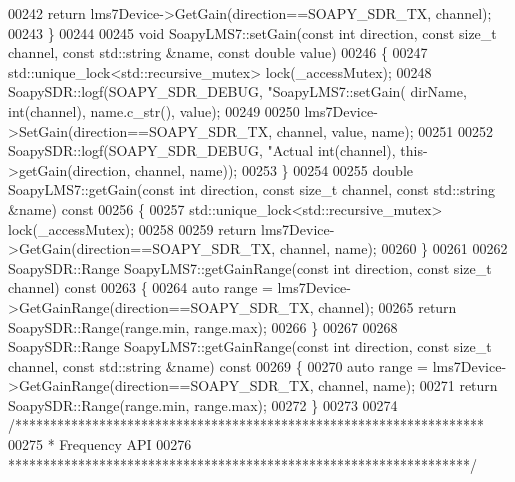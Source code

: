 \begin{DoxyCode}
{{{{{{{{00242     \textcolor{keywordflow}{return} lms7Device->GetGain(direction==SOAPY_SDR_TX, channel);
00243 \}
00244 
00245 \textcolor{keywordtype}{void} SoapyLMS7::setGain(\textcolor{keyword}{const} \textcolor{keywordtype}{int} direction, \textcolor{keyword}{const} \textcolor{keywordtype}{size\_t} channel, \textcolor{keyword}{const} 
      std::string &name, \textcolor{keyword}{const} \textcolor{keywordtype}{double} value)
00246 \{
00247     std::unique\_lock<std::recursive\_mutex> lock(_accessMutex);
00248     SoapySDR::logf(SOAPY_SDR_DEBUG, \textcolor{stringliteral}{"SoapyLMS7::setGain(%
      dirName, \textcolor{keywordtype}{int}(channel), name.c\_str(), value);
00249 
00250     lms7Device->SetGain(direction==SOAPY_SDR_TX, channel, value, name);
00251 
00252     SoapySDR::logf(SOAPY_SDR_DEBUG, \textcolor{stringliteral}{"Actual %
      int(channel), this->getGain(direction, channel, name));
00253 \}
00254 
00255 \textcolor{keywordtype}{double} SoapyLMS7::getGain(\textcolor{keyword}{const} \textcolor{keywordtype}{int} direction, \textcolor{keyword}{const} \textcolor{keywordtype}{size\_t} channel, \textcolor{keyword}{const} 
      std::string &name)\textcolor{keyword}{ const}
00256 \textcolor{keyword}{}\{
00257     std::unique\_lock<std::recursive\_mutex> lock(_accessMutex);
00258 
00259     \textcolor{keywordflow}{return} lms7Device->GetGain(direction==SOAPY_SDR_TX, channel, name);
00260 \}
00261 
00262 SoapySDR::Range SoapyLMS7::getGainRange(\textcolor{keyword}{const} \textcolor{keywordtype}{int} direction, \textcolor{keyword}{const} \textcolor{keywordtype}{size\_t} channel)\textcolor{keyword}{ const}
00263 \textcolor{keyword}{}\{
00264     \textcolor{keyword}{auto} range = lms7Device->GetGainRange(direction==SOAPY_SDR_TX, channel);
00265     \textcolor{keywordflow}{return} SoapySDR::Range(range.min, range.max);
00266 \}
00267 
00268 SoapySDR::Range SoapyLMS7::getGainRange(\textcolor{keyword}{const} \textcolor{keywordtype}{int} direction, \textcolor{keyword}{const} \textcolor{keywordtype}{size\_t} channel, \textcolor{keyword}{const} 
      std::string &name)\textcolor{keyword}{ const}
00269 \textcolor{keyword}{}\{
00270     \textcolor{keyword}{auto} range = lms7Device->GetGainRange(direction==SOAPY_SDR_TX, channel, name);
00271     \textcolor{keywordflow}{return} SoapySDR::Range(range.min, range.max);
00272 \}
00273 
00274 \textcolor{comment}{/*******************************************************************}
00275 \textcolor{comment}{ * Frequency API}
00276 \textcolor{comment}{ ******************************************************************/}
}}}}}}}}}}
\end{DoxyCode}
